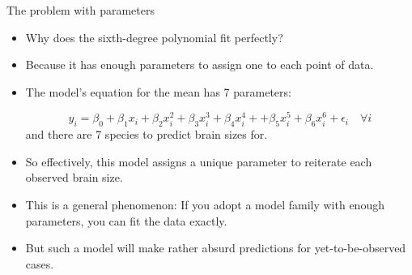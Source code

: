 \documentclass[handout]{beamer}
\begin{document}
\begin{frame}{The problem with parameters}
\scriptsize{

\begin{itemize}

\item Why does the sixth-degree polynomial fit perfectly? 
\item Because it has enough parameters to assign one to each point of data.

\item The model's equation for the mean has 7 parameters:

\begin{displaymath}
 y_i=\beta_{0}+\beta_{1}x_i +\beta_{2}x_i^2 +\beta_{3}x_i^3 +\beta_{4}x_i^4 ++\beta_{5}x_i^5+\beta_{6}x_i^6+\epsilon_i \quad \forall i
\end{displaymath}
and there are 7 species to predict brain sizes for.

\item So effectively, this model assigns a unique parameter to reiterate each observed brain size.
\item This is a general phenomenon: If you adopt a model family with enough parameters, you can fit the data exactly. 
\item But such a model will make rather absurd predictions for yet-to-be-observed cases.


\end{itemize}


} 
\end{frame}
\end{document}
